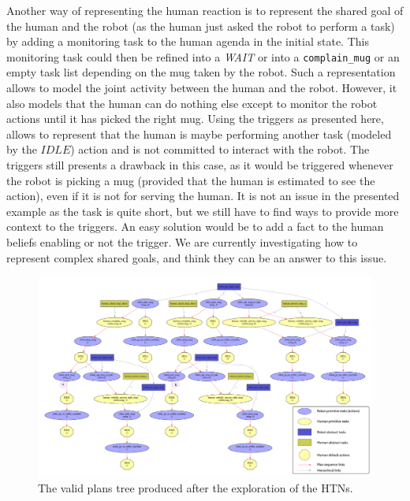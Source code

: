 \documentclass[a4paper,11pt,twoside]{StyleThese}
\begin{document}
Another way of representing the human reaction is to represent the shared goal of the human and the robot (as the human just asked the robot to perform a task) by adding a monitoring task to the human agenda in the initial state. This monitoring task could then be refined into a \textit{WAIT} or into a \verb'complain_mug' or an empty task list depending on the mug taken by the robot. Such a representation allows to model the joint activity between the human and the robot. However, it also models that the human can do nothing else except to monitor the robot actions until it has picked the right mug. Using the triggers as presented here, allows to represent that the human is maybe performing another task (modeled by the $IDLE$) action and is not committed to interact with the robot. The triggers still presents a drawback in this case, as it would be triggered whenever the robot is picking a mug (provided that the human is estimated to see the action), even if it is not for serving the human. It is not an issue in the presented example as the task is quite short, but we still have to find ways to provide more context to the triggers. An easy solution would be to add a fact to the human beliefs enabling or not the trigger. We are currently investigating how to represent complex shared goals, and think they can be an answer to this issue. 



\begin{figure}[hbtp]
\centering
\includegraphics[height=\textwidth,angle=90,origin=c]{figures/chapter4/mug_selection_search_space.png}
\caption{The valid plans tree produced after the exploration of the HTNs.}
\label{fig:chap4mugsss}
\end{figure}
\end{document}
